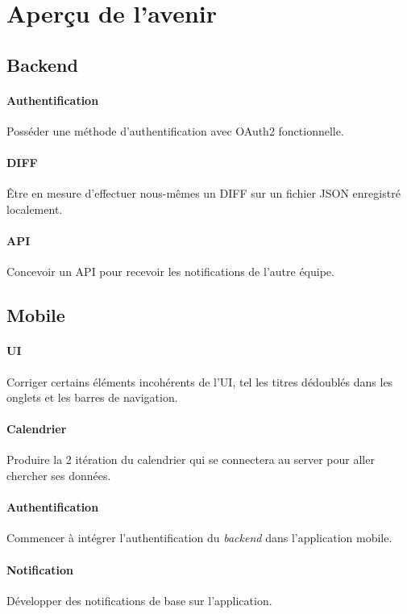 \section{Aperçu de l'avenir}
	\subsection{Backend}

	\paragraph{Authentification} Posséder une méthode d'authentification avec OAuth2 fonctionnelle.

	\paragraph{DIFF} Être en mesure d'effectuer nous-mêmes un DIFF sur un fichier JSON enregistré localement.

	\paragraph{API} Concevoir un API pour recevoir les notifications de l'autre équipe.
	
	\subsection{Mobile}
	
	\paragraph{UI} Corriger certains éléments incohérents de l'UI, tel les titres dédoublés dans les onglets et les barres de navigation.
	\paragraph{Calendrier} Produire la 2\ieme{} itération du calendrier qui se connectera au server pour aller chercher ses données.
	\paragraph{Authentification} Commencer à intégrer l'authentification du \emph{backend} dans l'application mobile.
	\paragraph{Notification} Développer des notifications de base sur l'application.
